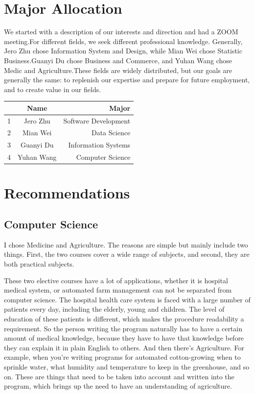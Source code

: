 \documentclass[12pt]{article}
\begin{document}
\section{Major Allocation}
We started with a description of our interests and direction and had a ZOOM meeting.For different fields, we seek different professional knowledge. Generally, Jero Zhu chose Information System and Design, while Mian Wei chose Statistic Business.Guanyi Du chose Business and Commerce, and Yuhan Wang chose Medic and Agriculture.These fields are widely distributed, but our goals are generally the same: to replenish our expertise and prepare for future employment, and to create value in our fields.
\begin{center}
\begin{tabular}{|l|c|r|}
\hline
  & Name      & Major                \\ \hline
1 & Jero Zhu  & Software Development \\ \hline
2 & Mian Wei  & Data Science         \\ \hline
3 & Guanyi Du & Information Systems  \\ \hline
4 & Yuhan Wang & Computer Science    \\ \hline
\end{tabular}
\end{center}

\newpage
\section{Recommendations}

\subsection{Computer Science}
I chose Medicine and Agriculture. The reasons are simple but mainly include two things. First, the two courses cover a wide range of subjects, and second, they are both practical subjects.

These two elective courses have a lot of applications, whether it is hospital medical system, or automated farm management can not be separated from computer science. The hospital health care system is faced with a large number of patients every day, including the elderly, young and children. The level of education of these patients is different, which makes the procedure readability a requirement. So the person writing the program naturally has to have a certain amount of medical knowledge, because they have to have that knowledge before they can explain it in plain English to others. And then there's Agriculture. For example, when you're writing programs for automated cotton-growing when to sprinkle water, what humidity and temperature to keep in the greenhouse, and so on. These are things that need to be taken into account and written into the program, which brings up the need to have an understanding of agriculture.
\end{document}

